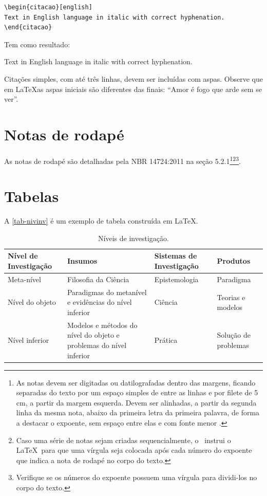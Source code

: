 \begin{verbatim}
\begin{citacao}[english]
Text in English language in italic with correct hyphenation.
\end{citacao}
\end{verbatim}

Tem como resultado:

\begin{citacao}[english]
Text in English language in italic with correct hyphenation.
\end{citacao}

Citações simples, com até três linhas, devem ser
incluídas com aspas. Observe que em \LaTeX as aspas iniciais são diferentes das
finais: ``Amor é fogo que arde sem se ver''.

\section{Notas de rodapé}

As notas de rodapé são detalhadas pela NBR 14724:2011 na seção 5.2.1\footnote{As
notas devem ser digitadas ou datilografadas dentro das margens, ficando
separadas do texto por um espaço simples de entre as linhas e por filete de 5
cm, a partir da margem esquerda. Devem ser alinhadas, a partir da segunda linha
da mesma nota, abaixo da primeira letra da primeira palavra, de forma a destacar
o expoente, sem espaço entre elas e com fonte menor
.}\footnote{Caso uma série de notas sejam
criadas sequencialmente, o \abnTeX\ instrui o \LaTeX\ para que uma vírgula seja
colocada após cada número do expoente que indica a nota de rodapé no corpo do
texto.}\footnote{Verifique se os números do expoente possuem uma vírgula para
dividi-los no corpo do texto.}. 


\section{Tabelas}

A \autoref{tab-nivinv} é um exemplo de tabela construída em
\LaTeX.

\begin{table}[htb]
\ABNTEXfontereduzida
\caption[Níveis de investigação]{Níveis de investigação.}
\label{tab-nivinv}
\begin{tabular}{p{2.6cm}|p{6.0cm}|p{2.25cm}|p{3.40cm}}
   \textbf{Nível de Investigação} & \textbf{Insumos}  & \textbf{Sistemas de Investigação}  & \textbf{Produtos}  \\
    \hline
    Meta-nível & Filosofia\index{filosofia} da Ciência  & Epistemologia &
    Paradigma  \\
    \hline
    Nível do objeto & Paradigmas do metanível e evidências do nível inferior &
    Ciência  & Teorias e modelos \\
    \hline
    Nível inferior & Modelos e métodos do nível do objeto e problemas do nível inferior & Prática & Solução de problemas  \\
\end{tabular}
\end{table}

